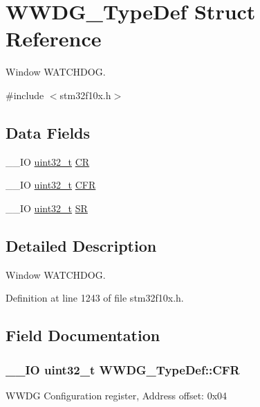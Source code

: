 \hypertarget{struct_w_w_d_g___type_def}{\section{W\-W\-D\-G\-\_\-\-Type\-Def Struct Reference}
\label{struct_w_w_d_g___type_def}
}


Window W\-A\-T\-C\-H\-D\-O\-G.  




{\ttfamily \#include $<$stm32f10x.\-h$>$}

\subsection*{Data Fields}
\begin{DoxyCompactItemize}
\item 
\-\_\-\-\_\-\-I\-O \hyperlink{stdint_8h_a435d1572bf3f880d55459d9805097f62}{uint32\-\_\-t} \hyperlink{struct_w_w_d_g___type_def_a4caf530d45f7428c9700d9c0057135f8}{C\-R}
\item 
\-\_\-\-\_\-\-I\-O \hyperlink{stdint_8h_a435d1572bf3f880d55459d9805097f62}{uint32\-\_\-t} \hyperlink{struct_w_w_d_g___type_def_adcd6a7e5d75022e46ce60291f4b8544c}{C\-F\-R}
\item 
\-\_\-\-\_\-\-I\-O \hyperlink{stdint_8h_a435d1572bf3f880d55459d9805097f62}{uint32\-\_\-t} \hyperlink{struct_w_w_d_g___type_def_a15655cda4854cc794db1f27b3c0bba38}{S\-R}
\end{DoxyCompactItemize}


\subsection{Detailed Description}
Window W\-A\-T\-C\-H\-D\-O\-G. 

Definition at line 1243 of file stm32f10x.\-h.



\subsection{Field Documentation}
\hypertarget{struct_w_w_d_g___type_def_adcd6a7e5d75022e46ce60291f4b8544c}{
\subsubsection[{C\-F\-R}]{\setlength{\rightskip}{0pt plus 5cm}\-\_\-\-\_\-\-I\-O {\bf uint32\-\_\-t} W\-W\-D\-G\-\_\-\-Type\-Def\-::\-C\-F\-R}}\label{struct_w_w_d_g___type_def_adcd6a7e5d75022e46ce60291f4b8544c}
W\-W\-D\-G Configuration register, Address offset\-: 0x04 


